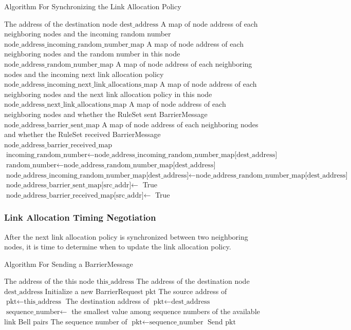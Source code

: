 \begin{algorithm}[H]  
  \caption{Algorithm For Synchronizing the Link Allocation Policy}                 
  \begin{algorithmic}[1]
    \Require The address of the destination node $\text{dest\_address}$
    \Require A map of node address of each neighboring nodes and the incoming random number $\text{node\_address\_incoming\_random\_number\_map}$
    \Require A map of node address of each neighboring nodes and the random number in this node $\text{node\_address\_random\_number\_map}$
    \Require  A map of node address of each neighboring nodes and the incoming next link allocation policy $\text{node\_address\_incoming\_next\_link\_allocations\_map}$
    \Require  A map of node address of each neighboring nodes and the next link allocation policy in this node $\text{node\_address\_next\_link\_allocations\_map}$
    \Require  A map of node address of each neighboring nodes and whether the RuleSet sent BarrierMessage $\text{node\_address\_barrier\_sent\_map}$
    \Require  A map of node address of each neighboring nodes and whether the RuleSet received BarrierMessage $\text{node\_address\_barrier\_received\_map}$
    \State $\text{incoming\_random\_number} \gets \text{node\_address\_incoming\_random\_number\_map[dest\_address]}$
    \State $\text{random\_number} \gets \text{node\_address\_random\_number\_map[dest\_address]}$
      \State $\text{node\_address\_incoming\_random\_number\_map[dest\_address]} \gets \text{node\_address\_random\_number\_map[dest\_address]}$
    \EndIf
    \State $\text{node\_address\_barrier\_sent\_map[src\_addr]} \gets$ True
    \State $\text{node\_address\_barrier\_received\_map[src\_addr]} \gets$ True
  \end{algorithmic}
\end{algorithm}

\subsubsection{Link Allocation Timing Negotiation}

After the next link allocation policy is synchronized between two neighboring nodes, it is time to determine when to update the link allocation policy.
\begin{algorithm}[H]  
  \caption{Algorithm For Sending a BarrierMessage}             
  \begin{algorithmic}[1]
    \Require The address of the this node $\text{this\_address}$      
    \Require The address of the destination node $\text{dest\_address}$    
    \State Initialize a new BarrierRequest $\text{pkt}$
    \State The source address of $\text{pkt} \gets \text{this\_address}$
    \State The destination address of $\text{pkt} \gets \text{dest\_address}$
    \State $\text{sequence\_number} \gets$ the smallest value among sequence numbers of the available link Bell pairs
    \State The sequence number of $\text{pkt} \gets \text{sequence\_number}$
    \State Send $\text{pkt}$
  \end{algorithmic}
\end{algorithm}

